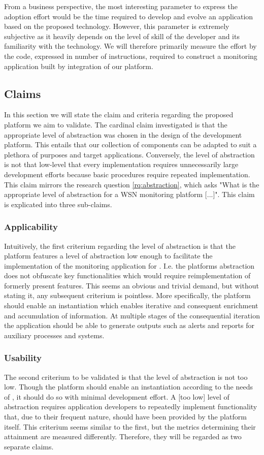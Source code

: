 From a business perspective, the most interesting parameter to express the adoption effort would be the time required to develop and evolve an application based on the proposed technology. However, this parameter is extremely subjective as it heavily depends on the level of skill of the developer and its familiarity with the technology. We will therefore primarily measure the effort by the code, expressed in number of instructions, required to construct a monitoring application built by integration of our platform. 

\subsection{Claims}
\label{sec:claims}
In this section we will state the claim and criteria regarding the proposed platform we aim to validate. The cardinal claim investigated is that the appropriate level of abstraction was chosen in the design of the development platform. This entails that our collection of components can be adapted to suit a plethora of purposes and target applications. Conversely, the level of abstraction is not that low-level that every implementation requires unnecessarily large development efforts because basic procedures require repeated implementation. This claim mirrors the research question \ref{rq:abstraction}, which asks "What is the appropriate level of abstraction for a WSN monitoring platform [...]". This claim is explicated into three sub-claims.

\subsubsection{Applicability}
Intuitively, the first criterium regarding the level of abstraction is that the platform features a level of abstraction low enough to facilitate the implementation of the monitoring application for \sensit. I.e. the platforms abstraction does not obfuscate key functionalities which would require reimplementation of formerly present features. This seems an obvious and trivial demand, but without stating it, any subsequent criterium is pointless. More specifically, the platform should enable an instantiation which enables iterative and consequent enrichment and accumulation of information. At multiple stages of the consequential iteration the application should be able to generate outputs such as alerts and reports for auxiliary processes and systems.

\subsubsection{Usability}
The second criterium to be validated is that the level of abstraction is not too low. Though the platform should enable an instantiation according to the needs of \idsystems, it should do so with minimal development effort. A [too low] level of abstraction requires application developers to repeatedly implement functionality that, due to their frequent nature, should have been provided by the platform itself. This criterium seems similar to the first, but the metrics determining their attainment are measured differently. Therefore, they will be regarded as two separate claims.

